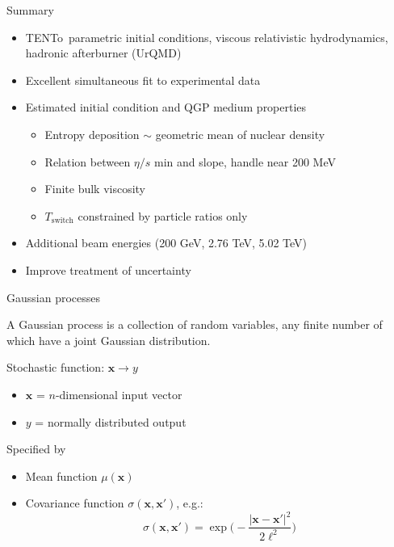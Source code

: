 \documentclass{beamer}
\newcommand{\trento}{T\raisebox{-.5ex}{R}ENTo}
\newcommand{\x}{\mathbf x}
\begin{document}
\begin{frame}{Summary}
  \begin{itemize}
    \item \trento\ parametric initial conditions, viscous relativistic hydrodynamics, hadronic afterburner (UrQMD)
      \smallskip
    \item Excellent simultaneous fit to experimental data
      \smallskip
    \item Estimated initial condition and QGP medium properties
      \begin{itemize}
        \item Entropy deposition $\sim$ geometric mean of nuclear density
        \item Relation between $\eta/s$ min and slope, handle near 200 MeV
        \item Finite bulk viscosity
        \item $T_\text{switch}$ constrained by particle ratios only
      \end{itemize}
      \bigskip
    \item Additional beam energies (200 GeV, 2.76 TeV, 5.02 TeV)
    \item Improve treatment of uncertainty
  \end{itemize}
\end{frame}


\appendix

\begin{frame}{Gaussian processes}
  \begin{definition}
    A Gaussian process is a collection of random variables, any finite number of which have a joint Gaussian distribution.
  \end{definition}
  \medskip
  Stochastic function: $\x \rightarrow y$ \\
  \begin{itemize}
    \item $\x$ = $n$-dimensional input vector
    \item $y$ = normally distributed output
  \end{itemize}
  Specified by
  \begin{itemize}
    \item Mean function $\mu(\x)$
    \item Covariance function $\sigma(\x, \x')$, e.g.:
      \begin{equation*}
        \sigma(\x, \x') = \exp\biggl( -\frac{|\x - \x'|^2}{2\ell^2} \biggr)
      \end{equation*}
  \end{itemize}
\end{frame}
\end{document}
